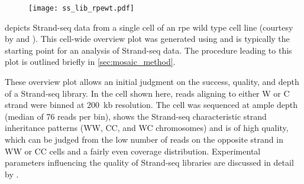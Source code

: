     \begin{figure}[t!]                                             %
        \captionsetup{type=figure}
        \texttt{[image: ss\_lib\_rpewt.pdf]}
    \end{figure}

 depicts Strand-seq data from a single cell of an \acf{rpe}
wild type cell line (courtesy by \balca and \landsdorp). This cell-wide overview
plot was generated using \mc and is typically the starting point for
an analysis of Strand-seq data. The procedure leading to this plot is outlined
briefly in \cref{sec:mosaic_method}.

These overview plot allows an initial judgment on the success, quality, and depth
of a Strand-seq library. In the cell shown here, reads aligning to either W or C
strand were binned at 200~kb resolution. The cell was sequenced at ample depth
(median of 76 reads per bin), shows the Strand-seq characteristic strand
inheritance patterns (WW, CC, and WC chromosomes) and is of high quality, which
can be judged from the low number of reads on the opposite strand in WW or CC
cells and a fairly even coverage distribution. Experimental parameters
influencing the quality of Strand-seq libraries are discussed in detail by
\cite{Sanders2017}.

